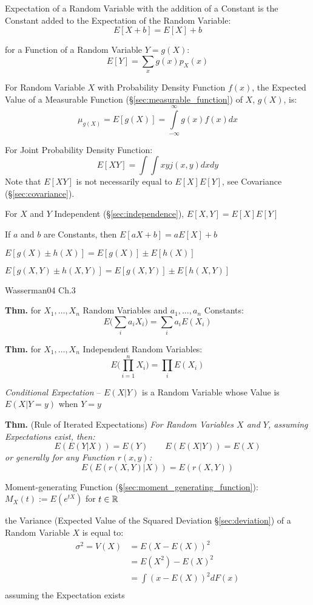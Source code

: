 Expectation of a Random Variable with the addition of a Constant is the
Constant added to the Expectation of the Random Variable:
\[
  E[X + b] = E[X] + b
\]

for a Function of a Random Variable $Y = g(X)$:
\[
  E[Y] = \sum_x g(x) p_X(x)
\]

For Random Variable $X$ with Probability Density Function $f(x)$, the
Expected Value of a Measurable Function
(\S\ref{sec:measurable_function}) of $X$, $g(X)$, is:
\[
  \mu_{g(X)} = E[g(X)] = \int\limits_{-\infty}^{\infty} g(x) f(x) dx
\]

For Joint Probability Density Function:
\[
  E[X Y] = \int\int x y j(x,y) dx dy
\]
\fist Note that $E[X Y]$ is not necessarily equal to $E[X] E[Y]$, see Covariance
(\S\ref{sec:covariance}).

For $X$ and $Y$ Independent (\S\ref{sec:independence}), $E[X,Y] = E[X] E[Y]$

If $a$ and $b$ are Constants, then $E[aX + b] = a E[X] + b$

$E [g(X) \pm h(X)] = E[g(X)] \pm E[h(X)]$

$E [g(X,Y) \pm h(X,Y)] = E[g(X,Y)] \pm E[h(X,Y)]$

Wasserman04 Ch.3

\textbf{Thm.} for $X_1, \ldots, X_n$ Random Variables and $a_1, \ldots, a_n$
Constants:
\[
  E\Big(\sum_i a_i X_i\Big) = \sum_i a_i E(X_i)
\]

\textbf{Thm.} for $X_1, \ldots, X_n$ Independent Random Variables:
\[
  E\Big(\prod_{i=1}^n X_i\Big) = \prod_i E(X_i)
\]

\emph{Conditional Expectation} -- $E(X|Y)$ is a Random Variable whose Value is
$E(X|Y = y)$ when $Y = y$

\textbf{Thm.} (Rule of Iterated Expectations) \emph{
  For Random Variables $X$ and $Y$, assuming Expectations exist, then:
  \[
    E(E(Y|X)) = E(Y) \quad\quad E(E(X|Y)) = E(X)
  \]
  or generally for any Function $r(x,y)$:
  \[
    E(E(r(X,Y)|X)) = E(r(X,Y))
  \]
}

Moment-generating Function (\S\ref{sec:moment_generating_function}):
$M_X(t) := E(e^{tX})$ for $t \in \mathbb{R}$

the Variance (Expected Value of the Squared Deviation \S\ref{sec:deviation}) of
a Random Variable $X$ is equal to:
\begin{align*}
  \sigma^2 = V(X) & = E(X - E(X))^2   \\
                  & = E(X^2) - E(X)^2 \\
                  & = \int(x - E(X))^2 dF(x) \\
\end{align*}
assuming the Expectation exists

